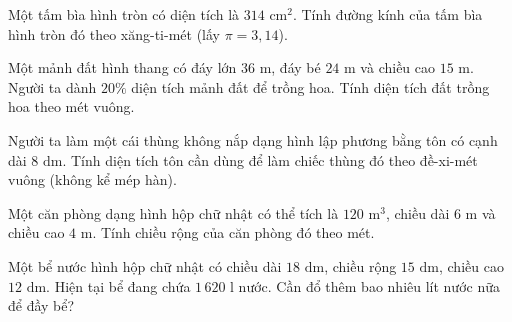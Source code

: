 \begin{ex} %
Một tấm bìa hình tròn có diện tích là $314\text{ cm}^2$. Tính đường kính của tấm bìa hình tròn đó theo xăng-ti-mét (lấy $\pi = 3{,}14$).
\end{ex}

\begin{ex} %
Một mảnh đất hình thang có đáy lớn $36\text{ m}$, đáy bé $24\text{ m}$ và chiều cao $15\text{ m}$. Người ta dành $20\%$ diện tích mảnh đất để trồng hoa. Tính diện tích đất trồng hoa theo mét vuông.
\end{ex}

\begin{ex} %
Người ta làm một cái thùng không nắp dạng hình lập phương bằng tôn có cạnh dài $8\text{ dm}$. Tính diện tích tôn cần dùng để làm chiếc thùng đó theo đề-xi-mét vuông (không kể mép hàn).
\end{ex}

\begin{ex} %
Một căn phòng dạng hình hộp chữ nhật có thể tích là $120\text{ m}^3$, chiều dài $6\text{ m}$ và chiều cao $4\text{ m}$. Tính chiều rộng của căn phòng đó theo mét.
\end{ex}

\begin{ex} %
Một bể nước hình hộp chữ nhật có chiều dài $18\text{ dm}$, chiều rộng $15\text{ dm}$, chiều cao $12\text{ dm}$. Hiện tại bể đang chứa $1\,620\text{ l}$ nước. Cần đổ thêm bao nhiêu lít nước nữa để đầy bể?
\end{ex}
